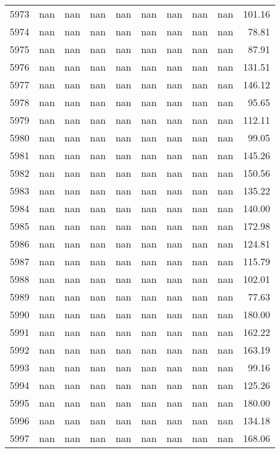 \begin{tabular}{lrrrrrrrrr}
5973 & nan & nan & nan & nan & nan & nan & nan & nan & 101.16 \\
5974 & nan & nan & nan & nan & nan & nan & nan & nan & 78.81 \\
5975 & nan & nan & nan & nan & nan & nan & nan & nan & 87.91 \\
5976 & nan & nan & nan & nan & nan & nan & nan & nan & 131.51 \\
5977 & nan & nan & nan & nan & nan & nan & nan & nan & 146.12 \\
5978 & nan & nan & nan & nan & nan & nan & nan & nan & 95.65 \\
5979 & nan & nan & nan & nan & nan & nan & nan & nan & 112.11 \\
5980 & nan & nan & nan & nan & nan & nan & nan & nan & 99.05 \\
5981 & nan & nan & nan & nan & nan & nan & nan & nan & 145.26 \\
5982 & nan & nan & nan & nan & nan & nan & nan & nan & 150.56 \\
5983 & nan & nan & nan & nan & nan & nan & nan & nan & 135.22 \\
5984 & nan & nan & nan & nan & nan & nan & nan & nan & 140.00 \\
5985 & nan & nan & nan & nan & nan & nan & nan & nan & 172.98 \\
5986 & nan & nan & nan & nan & nan & nan & nan & nan & 124.81 \\
5987 & nan & nan & nan & nan & nan & nan & nan & nan & 115.79 \\
5988 & nan & nan & nan & nan & nan & nan & nan & nan & 102.01 \\
5989 & nan & nan & nan & nan & nan & nan & nan & nan & 77.63 \\
5990 & nan & nan & nan & nan & nan & nan & nan & nan & 180.00 \\
5991 & nan & nan & nan & nan & nan & nan & nan & nan & 162.22 \\
5992 & nan & nan & nan & nan & nan & nan & nan & nan & 163.19 \\
5993 & nan & nan & nan & nan & nan & nan & nan & nan & 99.16 \\
5994 & nan & nan & nan & nan & nan & nan & nan & nan & 125.26 \\
5995 & nan & nan & nan & nan & nan & nan & nan & nan & 180.00 \\
5996 & nan & nan & nan & nan & nan & nan & nan & nan & 134.18 \\
5997 & nan & nan & nan & nan & nan & nan & nan & nan & 168.06 \\

\end{tabular}
